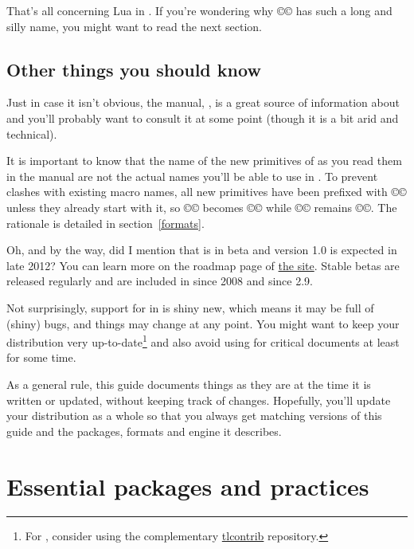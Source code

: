 \documentclass{lltxdoc}
\begin{document}
That's all concerning Lua in \tex. If you're wondering why
©\luatexluaescapestring© has such a long and silly name, you might want to
read the next section.

\subsection{Other things you should know}\label{things}

Just in case it isn't obvious, the \luatex manual, , is
a great source of information about \luatex and you'll probably want to
consult it at some point (though it is a bit arid and technical).

It is important to know that the name of the new primitives of \luatex as you
read them in the manual are not the actual names you'll be able to use in
\lualatex. To prevent clashes with existing macro names, all new primitives
have been prefixed with ©\luatex© unless they already start with it, so
©\luaescapestring© becomes ©\luatexluaescapetring© while ©\luatexversion©
remains ©\luatexversion©. The rationale is detailed in section~\ref{formats}.

\medskip

Oh, and by the way, did I mention that \luatex is in beta and version 1.0 is
expected in late 2012? You can learn more on the roadmap page of
\href{http://luatex.org/}{the \luatex site}. Stable betas are released
regularly and are included in \texlive since 2008 and \miktex since 2.9.

Not surprisingly, support for \luatex in \latex is shiny new, which means it
may be full of (shiny) bugs, and things may change at any point. You might
want to keep your \tex distribution very up-to-date\footnote{For \texlive,
  consider using the complementary
  \href{http://tlcontrib.metatex.org/} {tlcontrib} repository.} and also avoid
using \lualatex for critical documents at least for some time.

As a general rule, this guide documents things as they are at the time it is
written or updated, without keeping track of changes. Hopefully, you'll update
your distribution as a whole so that you always get matching versions of this
guide and the packages, formats and engine it describes.


\section{Essential packages and practices}\label{essential}
\end{document}
